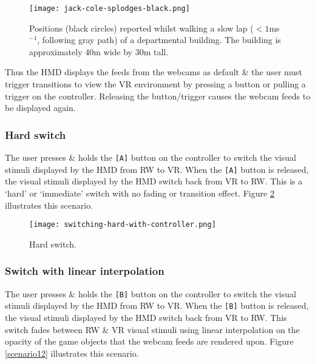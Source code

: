 \begin{figure}[h]
	\begin{center}
		\texttt{[image: jack-cole-splodges-black.png]}
		\caption{Positions (black circles) reported whilst walking a slow lap ($<1$ms$^{-1}$, following gray path) of a departmental building. The building is approximately 40m wide by 30m tall.}
		\label{jack-cole-splodges}
	\end{center}
\end{figure}

Thus the HMD displays the feeds from the webcams as default \& the user must trigger transitions to view the VR environment by pressing a button or pulling a trigger on the controller. Releasing the button/trigger causes the webcam feeds to be displayed again.


\subsubsection{Hard switch}
\label{sub-hardswitch}
The user presses \& holds the \texttt{[A]} button on the controller to switch the visual stimuli displayed by the HMD from RW to VR. When the \texttt{[A]} button is released, the visual stimuli displayed by the HMD switch back from VR to RW. This is a `hard' or `immediate' switch with no fading or transition effect. Figure \ref{scenario1} illustrates this scenario.

\begin{figure}[h]
	\begin{center}
		\texttt{[image: switching-hard-with-controller.png]}
		\caption{Hard switch.}
		\label{scenario1}
	\end{center}
\end{figure}


\subsubsection{Switch with linear interpolation}
The user presses \& holds the \texttt{[B]} button on the controller to switch the visual stimuli displayed by the HMD from RW to VR. When the \texttt{[B]} button is released, the visual stimuli displayed by the HMD switch back from VR to RW. This switch fades between RW \& VR  visual stimuli using linear interpolation on the opacity of the game objects that the webcam feeds are rendered upon. Figure \ref{scenario12} illustrates this scenario.

